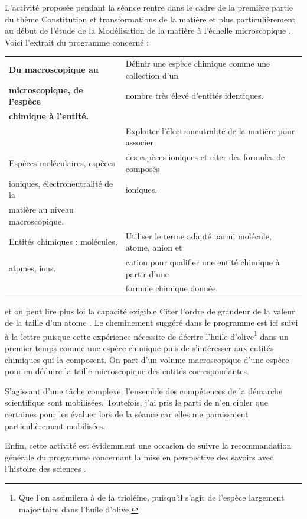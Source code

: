 \documentclass[12pt,a4paper]{article}
\begin{document}
L'activité proposée pendant la séance rentre dans le cadre de la première partie du thème \og Constitution et transformations de la matière \fg{} et plus particulièrement au début de l'étude de la \og Modélisation de la matière à l'échelle microscopique \fg{}.
Voici l'extrait du programme concerné :
\begin{center}
\begin{tabular}{|l|l|}
\hline
\textbf{Du macroscopique au} 			& Définir une espèce chimique comme une collection d'un \\
\textbf{microscopique, de l'espèce}	& nombre très élevé d'entités identiques. \\
\textbf{chimique à l'entité.}					& \\
																& Exploiter l'électroneutralité de la matière pour associer\\
Espèces moléculaires, espèces		& des espèces ioniques et citer des formules de composés\\
ioniques, électroneutralité de la			& ioniques.\\
matière au niveau	 macroscopique.	& \\
\hline
Entités chimiques : molécules,			& Utiliser le terme adapté parmi molécule, atome, anion et \\
atomes, ions.											& cation pour qualifier une entité chimique à partir d'une \\
																& formule chimique donnée. \\
\hline
\end{tabular}
\end{center}
et on peut lire plus loi la capacité exigible \og Citer l'ordre de grandeur de la valeur de la taille d'un atome \fg{}.
Le cheminement suggéré dans le programme est ici suivi à la lettre puisque cette expérience nécessite de décrire l'huile d'olive\footnote{Que l'on assimilera à de la trioléine, puisqu'il s'agit de l'espèce largement majoritaire dans l'huile d'olive.} dans un premier temps comme une espèce chimique puis de s'intéresser aux entités chimiques qui la composent.
On part d'un volume macroscopique d'une espèce pour en déduire la taille microscopique des entités correspondantes.

S'agissant d'une tâche complexe, l'ensemble des compétences de la démarche scientifique sont mobilisées.
Toutefois, j'ai pris le parti de n'en cibler que certaines pour les évaluer lors de la séance car elles me paraissaient particulièrement mobilisées.

Enfin, cette activité est évidemment une occasion de suivre la recommandation générale du programme concernant la \og mise en perspective des savoirs avec l'histoire des sciences \fg{}.
\end{document}
